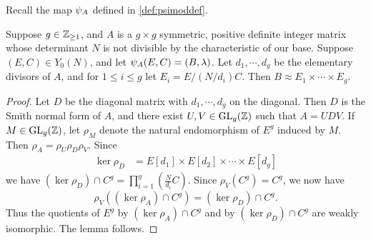\documentclass{amsart}
\begin{document}
Recall the map $\psi_{A}$ defined in \eqref{def:psimoddef}.

\begin{lemma}\label{lem:psimod-weakly-isomorphic-to-product}
Suppose $g\in\mathbb{Z}_{\ge 1}$, and $A$ is a $g \times g$ symmetric, positive definite integer matrix whose determinant $N$ is not divisible by the characteristic of our base. %
Suppose $(E,C) \in Y_0(N)$, and let $\psi_{A}(E,C) = (B,\lambda)$.  Let $d_1, \cdots, d_g$ be the elementary divisors of $A$, and for $1 \le i \le g$ let $E_i = E/(N/d_i)C$. Then
$
    B \approx E_1 \times \cdots \times E_g.
$
\end{lemma}

\begin{proof}
  Let $D$ be the diagonal matrix with $d_1, \cdots, d_g$ on the diagonal.
Then $D$ is the Smith normal form of $A$, and there exist $U,V \in \operatorname{GL}_g(\mathbb{Z})$ such that $A = UDV$.
If $M \in \operatorname{GL}_g(\mathbb{Z})$, let $\rho_M$ denote the natural endomorphism of $E^g$ induced by $M$.
Then %
$\rho_A = \rho_U \rho_D \rho_V$. Since
  \begin{align*}
    \ker \rho_D &= E[d_1] \times E[d_2] \times \cdots \times E[d_g]
  \end{align*}
  we have $(\ker \rho_D) \cap C^g = \prod_{i=1}^g (\frac{N}{d_i}C)$. 
 Since $\rho_V(C^g) = C^g$, we now have
  \[
    \rho_V((\ker \rho_A) \cap C^g) = (\ker \rho_D) \cap C^g.
  \]
  Thus the quotients of $E^g$ by $(\ker \rho_A) \cap C^g$ and by $(\ker \rho_D) \cap C^g$ are weakly isomorphic. The lemma follows.
\end{proof}
\end{document}
